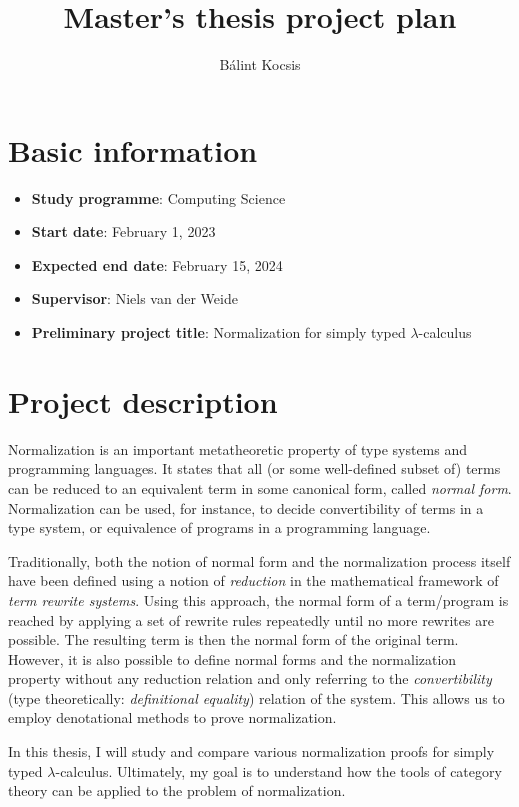 \documentclass{article}
\title{Master's thesis project plan}
\author{Bálint Kocsis}
\date{}
\begin{document}
\maketitle

\section*{Basic information}

\begin{itemize}
\parskip = 0pt
\item \textbf{Study programme}: Computing Science
\item \textbf{Start date}: February 1, 2023
\item \textbf{Expected end date}: February 15, 2024
\item \textbf{Supervisor}: Niels van der Weide
\item \textbf{Preliminary project title}: Normalization for simply typed $\lambda$-calculus
\end{itemize}

\section*{Project description}

Normalization is an important metatheoretic property of type systems and programming languages. It states that all (or some well-defined subset of) terms can be reduced to an equivalent term in some canonical form, called \textit{normal form}. Normalization can be used, for instance, to decide convertibility of terms in a type system, or equivalence of programs in a programming language.

Traditionally, both the notion of normal form and the normalization process itself have been defined using a notion of \textit{reduction} in the mathematical framework of \textit{term rewrite systems}. Using this approach, the normal form of a term/program is reached by applying a set of rewrite rules repeatedly until no more rewrites are possible. The resulting term is then the normal form of the original term. However, it is also possible to define normal forms and the normalization property without any reduction relation and only referring to the \textit{convertibility} (type theoretically: \textit{definitional equality}) relation of the system. This allows us to employ denotational methods to prove normalization.

In this thesis, I will study and compare various normalization proofs for simply typed $\lambda$-calculus. Ultimately, my goal is to understand how the tools of category theory can be applied to the problem of normalization.
\end{document}
